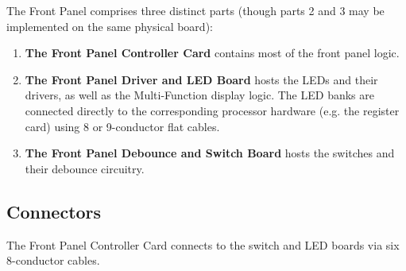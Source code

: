 \documentclass[11pt,a4paper,twocolumns]{article}
\begin{document}
The Front Panel comprises three distinct parts (though parts 2 and 3
may be implemented on the same physical board):

\begin{enumerate}
\item{\bf The Front Panel Controller Card} contains most of the front
  panel logic.
\item{\bf The Front Panel Driver and LED Board} hosts the LEDs and
  their drivers, as well as the Multi-Function display logic. The LED
  banks are connected directly to the corresponding processor hardware
  (e.g. the register card) using 8 or 9-conductor flat cables.
\item{\bf The Front Panel Debounce and Switch Board} hosts the switches
  and their debounce circuitry.
\end{enumerate}

\subsection{Connectors}

The Front Panel Controller Card connects to the switch and LED boards
via six 8-conductor cables.
\end{document}
